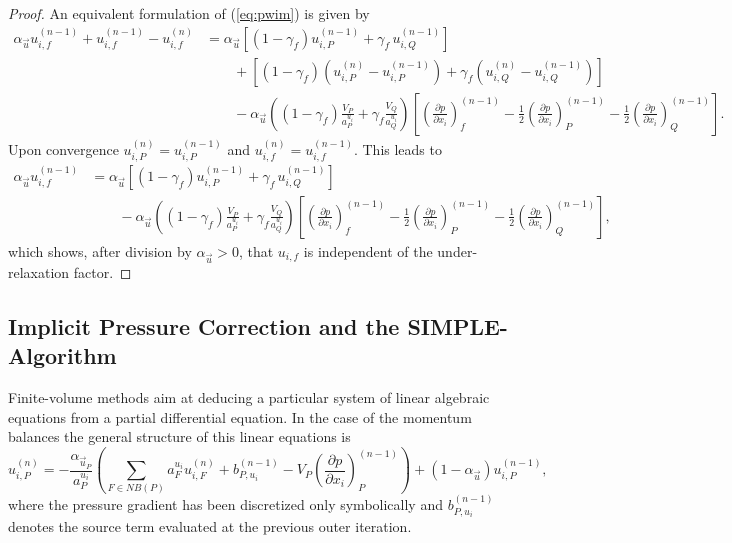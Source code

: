 \begin{proof}
  An equivalent formulation of (\ref{eq:pwim}) is given by
\begin{align*}
  \alpha_\vec{u} u_{i,f}^{(n-1)} + u_{i,f}^{(n-1)} - u_{i,f}^{(n)} 
  &=
  \alpha_\vec{u} \left[\left(1 - \gamma_f\right) u_{i,P}^{(n-1)} + \gamma_f \, u_{i,Q}^{(n-1)} \right] \\[1em]
  &\quad\quad + \left[\left(1 - \gamma_f\right) \left( u_{i,P}^{(n)} - u_{i,P}^{(n-1)}\right) + \gamma_f \left( u_{i,Q}^{(n)} - u_{i,Q}^{(n-1)} \right) \right] \nonumber\\[1em]
  &\quad\quad - 
  \alpha_\vec{u} \left(\left(1 - \gamma_f\right) \frac{ V_P}{a_P^{u_i}} + \gamma_f \frac{V_Q}{a_Q^{u_i}}\right)
  \left[ 
  \left(\frac{\partial p}{\partial x_i}\right)_f^{(n-1)} 
  - \frac{1}{2} \left( \frac{\partial p}{\partial x_i} \right)_P^{(n-1)} 
  - \frac{1}{2} \left(\frac{\partial p}{\partial x_i}\right)_Q^{(n-1)} 
  \right]. \nonumber
\end{align*}
Upon convergence \(u_{i,P}^{(n)} = u_{i,P}^{(n-1)}\) and \(u_{i,f}^{(n)} = u_{i,f}^{(n-1)}\). This leads to
\begin{align*}
  \alpha_\vec{u} u_{i,f}^{(n-1)} 
  &=
  \alpha_\vec{u} \left[\left(1 - \gamma_f\right) u_{i,P}^{(n-1)} + \gamma_f \, u_{i,Q}^{(n-1)} \right] \\[1em]
  &\quad\quad - 
  \alpha_\vec{u} \left(\left(1 - \gamma_f\right) \frac{ V_P}{a_P^{u_i}} + \gamma_f \frac{V_Q}{a_Q^{u_i}}\right)
  \left[ 
  \left(\frac{\partial p}{\partial x_i}\right)_f^{(n-1)} 
  - \frac{1}{2} \left( \frac{\partial p}{\partial x_i} \right)_P^{(n-1)} 
  - \frac{1}{2} \left(\frac{\partial p}{\partial x_i}\right)_Q^{(n-1)} 
  \right], \nonumber
\end{align*}
which shows, after division by \(\alpha_\vec{u} > 0\), that \(u_{i,f}\) is independent of the under-relaxation factor.
\end{proof}

\subsection{Implicit Pressure Correction and the SIMPLE-Algorithm}
\label{sec:simple}

Finite-volume methods aim at deducing a particular system of linear algebraic equations from a partial differential equation. In the case of the momentum balances the general structure of this linear equations is
\begin{displaymath}
  \label{eq:linfinal}
  u_{i,P}^{(n)} 
  = 
  - \frac{\alpha_{\vec{u}_P}}{a_P^{u_i}} \left(\sum_{F \in NB(P)} a_F^{u_i} u_{i,F}^{(n)}
  +                                     b_{P,u_i}^{(n-1)} 
  -                                     V_P\left(\frac{\partial p}{\partial x_i}\right)_P^{(n-1)} \right)
  + \left(1 - \alpha_{\vec{u}}\right) u_{i,P}^{(n-1)},
\end{displaymath}
where the pressure gradient has been discretized only symbolically and \(b_{P,u_i}^{(n-1)}\) denotes the source term evaluated at the previous outer iteration.

